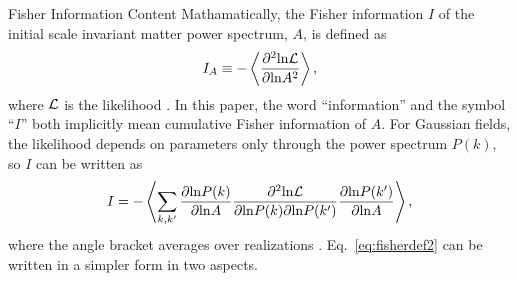 \begin{section}{Fisher Information Content}
  \label{sec:fisherinfo}
  Mathamatically, the Fisher information $I$ of the initial scale
  invariant matter power spectrum, $A$, is defined as
  \begin{align}
    I_A \equiv -\left\langle \frac{\partial ^2 \mathrm{ln \mathcal{L}}}{\partial  \mathrm{ln} A ^2}\right\rangle,
    \label{eq:fisherdefine}
  \end{align}
  where $\mathcal{L}$ is the likelihood \cite{bib:Tegmark1997}.  
  In this paper, the word \enquote{information} and the symbol \enquote{$I$} both implicitly 
  mean cumulative Fisher information 
  of $A$. For Gaussian
  fields, the likelihood depends on parameters only through the
  power spectrum $P(k)$, so $I$ can be written as 
  \begin{align}
    I = - \left\langle \sum_{k,k'} \frac{\partial \mathrm{ln} P(k)}{\partial \mathrm{ln} A} 
    \frac{\partial ^2 \mathrm{ln \mathcal{L}}}{\partial \mathrm{ln} P(k) \partial \mathrm{ln} P(k')}
    \frac{\partial \mathrm{ln} P(k')}{\partial \mathrm{ln} A}\right\rangle,
    \label{eq:fisherdef2}
  \end{align}
  where the angle bracket averages over realizations
  \cite{bib:Rimes2006}.
  Eq.~\ref{eq:fisherdef2} can be written in a simpler
  form in two aspects.   
  

\end{section}
